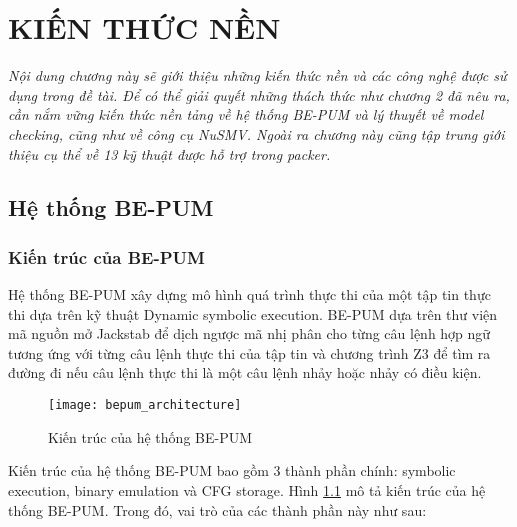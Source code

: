 
\newpage
\chapter{KIẾN THỨC NỀN}

\begin{concept}[15cm]
\textit{Nội dung chương này sẽ giới thiệu những kiến thức nền và các công nghệ được sử dụng trong đề tài. Để có thể giải quyết những thách thức như chương 2 đã nêu ra, cần nắm vững kiến thức nền tảng về hệ thống BE-PUM và lý thuyết về model checking, cũng như về công cụ NuSMV. Ngoài ra chương này cũng tập trung giới thiệu cụ thể về 13 kỹ thuật được hỗ trợ trong packer.}
\end{concept}

\section{Hệ thống BE-PUM}

\subsection{Kiến trúc của BE-PUM}

\hspace{0.5cm}Hệ thống BE-PUM xây dựng mô hình quá trình thực thi của một tập tin thực thi dựa trên kỹ thuật Dynamic symbolic execution. BE-PUM dựa trên thư viện mã nguồn mở Jackstab để dịch ngược mã nhị phân cho từng câu lệnh hợp ngữ tương ứng với từng câu lệnh thực thi của tập tin và chương trình Z3 để tìm ra đường đi nếu câu lệnh thực thi là một câu lệnh nhảy hoặc nhảy có điều kiện.

\begin{figure}[h]
\centering
\texttt{[image: bepum\_architecture]}
\caption{Kiến trúc của hệ thống BE-PUM}
\label{fig:BepumArchi}
\end{figure}

\hspace{0.5cm}Kiến trúc của hệ thống BE-PUM bao gồm 3 thành phần chính: symbolic execution, binary emulation và CFG storage. Hình \ref {fig:BepumArchi} mô tả kiến trúc của hệ thống BE-PUM. Trong đó, vai trò của các thành phần này như sau:


